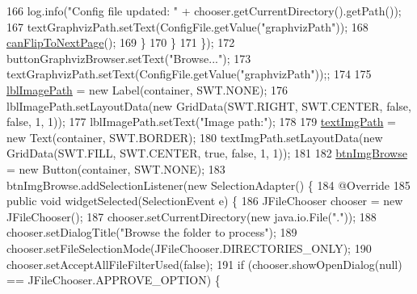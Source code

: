 \begin{DoxyCode}
166                     log.info(\textcolor{stringliteral}{"Config file updated: "} + chooser.getCurrentDirectory().getPath());
167                     textGraphvizPath.setText(ConfigFile.getValue(\textcolor{stringliteral}{"graphvizPath"}));
168                     \hyperlink{classit_1_1isislab_1_1masonassisteddocumentation_1_1mason_1_1wizards_1_1_b___project_information_page_a4ad2c0b1269d22b81ffc9e77f399c6af}{canFlipToNextPage}();
169                 \}
170             \}
171         \});
172         buttonGraphvizBrowser.setText(\textcolor{stringliteral}{"Browse..."});
173         textGraphvizPath.setText(ConfigFile.getValue(\textcolor{stringliteral}{"graphvizPath"}));;
174         
175         \hyperlink{classit_1_1isislab_1_1masonassisteddocumentation_1_1mason_1_1wizards_1_1_b___project_information_page_a6c9ce7d939e8bd032a1f2fb5e42f0d78}{lblImagePath} = \textcolor{keyword}{new} Label(container, SWT.NONE);
176         lblImagePath.setLayoutData(\textcolor{keyword}{new} GridData(SWT.RIGHT, SWT.CENTER, \textcolor{keyword}{false}, \textcolor{keyword}{false}, 1, 1));
177         lblImagePath.setText(\textcolor{stringliteral}{"Image path:"});
178         
179         \hyperlink{classit_1_1isislab_1_1masonassisteddocumentation_1_1mason_1_1wizards_1_1_b___project_information_page_a1217897a98e0714c9e7d8141b4e931d1}{textImgPath} = \textcolor{keyword}{new} Text(container, SWT.BORDER);
180         textImgPath.setLayoutData(\textcolor{keyword}{new} GridData(SWT.FILL, SWT.CENTER, \textcolor{keyword}{true}, \textcolor{keyword}{false}, 1, 1));
181         
182         \hyperlink{classit_1_1isislab_1_1masonassisteddocumentation_1_1mason_1_1wizards_1_1_b___project_information_page_a6afdf6ba02f0bf721af2acd61a2a1a5c}{btnImgBrowse} = \textcolor{keyword}{new} Button(container, SWT.NONE);
183         btnImgBrowse.addSelectionListener(\textcolor{keyword}{new} SelectionAdapter() \{
184             @Override
185             \textcolor{keyword}{public} \textcolor{keywordtype}{void} widgetSelected(SelectionEvent e) \{
186                 JFileChooser chooser = \textcolor{keyword}{new} JFileChooser();
187                 chooser.setCurrentDirectory(\textcolor{keyword}{new} java.io.File(\textcolor{stringliteral}{"."}));
188                 chooser.setDialogTitle(\textcolor{stringliteral}{"Browse the folder to process"});
189                 chooser.setFileSelectionMode(JFileChooser.DIRECTORIES\_ONLY);
190                 chooser.setAcceptAllFileFilterUsed(\textcolor{keyword}{false});
191                 \textcolor{keywordflow}{if} (chooser.showOpenDialog(null) == JFileChooser.APPROVE\_OPTION) \{                  

\end{DoxyCode}
